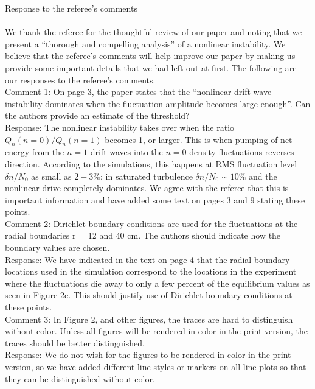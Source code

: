 \documentclass[12pt]{article}
\begin{document}
Response to the referee's comments \\ \\ 

We thank the referee for the thoughtful review of our paper and noting that we present a ``thorough and compelling analysis'' of a nonlinear instability. We believe that the referee's comments will help
improve our paper by making us provide some important details that we had left out at first. The following are our responses to the referee's comments. \\

Comment 1:   On page 3, the paper states that the “nonlinear drift wave instability dominates when
the fluctuation amplitude becomes large enough”. Can the authors provide an estimate of the threshold? \\

Response: The nonlinear instability takes over when the ratio $Q_n(n=0)/Q_n(n=1)$ becomes 1, or larger. This is when pumping of net energy from the $n=1$ drift waves
into the $n=0$ density fluctuations reverses direction. According to the simulations, this happens at RMS fluctuation level $\delta n/N_0$ as small as $2-3\%$;
in saturated turbulence $\delta n/N_0 \sim 10 \%$ and the nonlinear drive completely dominates.
We agree with the referee that this is important information and have added some text on pages 3 and 9 stating these points. \\

Comment 2:    Dirichlet boundary conditions are used for the fluctuations at the radial boundaries r = 12 and 40 cm. The authors should indicate how the boundary values are chosen. \\

Response: We have indicated in the text on page 4 that the radial boundary locations used in the simulation correspond to the locations in the experiment where the fluctuations die away to only
a few percent of the equilibrium values as seen in Figure 2c. This should justify use of Dirichlet boundary conditions at these points. \\

Comment 3:  In Figure 2, and other figures, the traces are hard to distinguish without color. Unless all figures will be rendered in color in the print version, the traces should be better
distinguished. \\

Response: We do not wish for the figures to be rendered in color in the print version, so we have added different line styles or markers on all line plots so that they can be 
distinguished without color. \\
\end{document}
